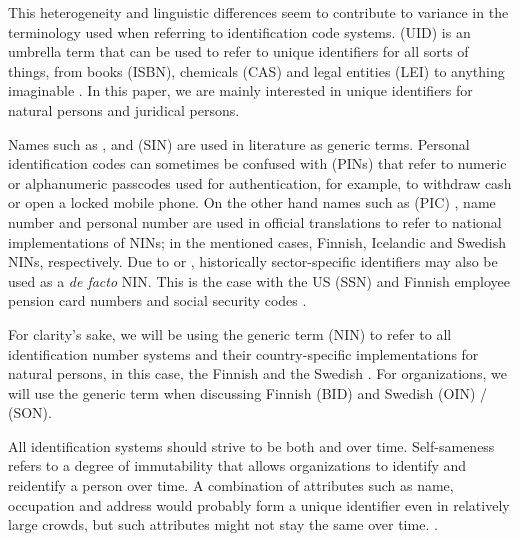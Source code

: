 This heterogeneity and linguistic differences seem to contribute to variance in the terminology used when referring to identification code systems.  (UID) is an umbrella term that can be used to refer to unique identifiers for all sorts of things, from books (ISBN), chemicals (CAS) and legal entities (LEI) to anything imaginable \citep[see][]{dodge2005}. In this paper, we are mainly interested in unique identifiers for natural persons and juridical persons. 

Names such as  \citep{dodge2005},  \citep{alastalo2022} and  (SIN) \citep{otjacques2007} are used in literature as generic terms. Personal identification codes can sometimes be confused with  (PINs) that refer to numeric or alphanumeric passcodes used for authentication, for example, to withdraw cash or open a locked mobile phone. On the other hand names such as  (PIC) \citep{hetudvv, sund2012}, name number \citep{watson2010} and personal number \citep{scb2016} are used in official translations to refer to national implementations of NINs; in the mentioned cases, Finnish, Icelandic and Swedish NINs, respectively. Due to  \citep[see][]{brensinger2021, alastalo2022} or  \citep[see][]{dodge2005}, historically sector-specific identifiers may also be used as a \emph{de facto} NIN. This is the case with the US  (SSN) \citep{brensinger2021} and Finnish employee pension card numbers and social security codes \citep{alastalo2022}.

For clarity's sake, we will be using the generic term  (NIN) to refer to all identification number systems and their country-specific implementations for natural persons, in this case, the Finnish  and the Swedish . For organizations, we will use the generic term  when discussing Finnish  (BID) and Swedish  (OIN) /  (SON).

All identification systems should strive to be both  and  over time. Self-sameness refers to a degree of immutability that allows organizations to identify and reidentify a person over time. A combination of attributes such as name, occupation and address would probably form a unique identifier even in relatively large crowds, but such attributes might not stay the same over time. \citep{brensinger2021}.

